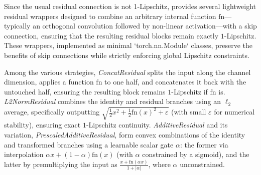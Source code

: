 Since the usual residual connection is not 1-Lipschitz, \Orthogonium provides several lightweight residual wrappers designed to combine an arbitrary internal function $\mathrm{fn}$—typically an orthogonal convolution followed by non-linear activation—with a skip connection, ensuring that the resulting residual blocks remain exactly $1$-Lipschitz. These wrappers, implemented as minimal `torch.nn.Module` classes, preserve the benefits of skip connections while strictly enforcing global Lipschitz constraints.





Among the various strategies, \textit{ConcatResidual} splits the input along the channel dimension, applies a function $\mathrm{fn}$ to one half, and concatenates it back with the untouched half, ensuring the resulting block remains $1$-Lipschitz if $\mathrm{fn}$ is. \textit{L2NormResidual} combines the identity and residual branches using an $\ell_{2}$ average, specifically outputting $\sqrt{\tfrac12 x^{2}+\tfrac12\mathrm{fn}(x)^{2}+\varepsilon}$ (with small $\varepsilon$ for numerical stability), ensuring exact $1$-Lipschitz continuity. \textit{AdditiveResidual} and its variation, \textit{PrescaledAdditiveResidual}, form convex combinations of the identity and transformed branches using a learnable scalar gate $\alpha$: the former via interpolation $\alpha x + (1-\alpha)\mathrm{fn}(x)$ (with $\alpha$ constrained by a sigmoid), and the latter by premultiplying the input as $ \frac{x+\mathrm{fn}(\alpha x)}{1+\lvert\alpha\rvert}$, where $\alpha$ unconstrained.

